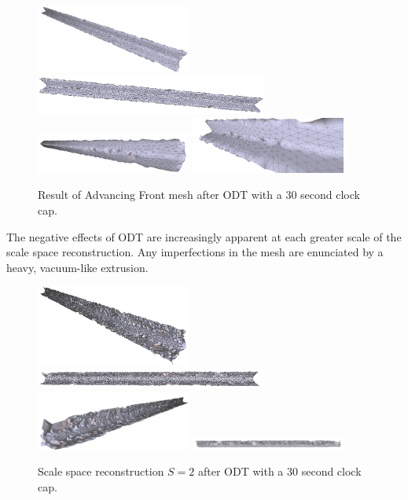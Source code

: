 \documentclass[12pt]{drexelthesis}
\begin{document}
\begin{figure}[!ht]
	\centering
		\includegraphics[width=2in]{simulated-lab-scan/0noise/optimized/advancedfrontlloydodt00.png}
		\includegraphics[width=3in]{simulated-lab-scan/0noise/optimized/advancedfrontlloydodt01.png}
		\includegraphics[width=2in]{simulated-lab-scan/0noise/optimized/advancedfrontlloydodt02.png}
		\includegraphics[width=2in]{simulated-lab-scan/0noise/optimized/advancedfrontlloydodt03.png}
		\caption[Advancing Front mesh after ODT with a 30 second clock cap]{\centering  Result of Advancing Front mesh after ODT with a 30 second clock cap.}
	\label{zeronoise:advancedodt}
\end{figure}

The negative effects of ODT are increasingly apparent at each greater scale of the scale space reconstruction. Any imperfections in the mesh are enunciated by a heavy, vacuum-like extrusion.

\begin{figure}[!ht]
	\centering
		\includegraphics[width=2in]{simulated-lab-scan/0noise/optimized/scalespace2odt00.png}
		\includegraphics[width=3in]{simulated-lab-scan/0noise/optimized/scalespace2odt01.png}
		\includegraphics[width=2in]{simulated-lab-scan/0noise/optimized/scalespace2odt02.png}
		\includegraphics[width=2in]{simulated-lab-scan/0noise/optimized/scalespace2odt03.png}
		\caption[Scale space reconstruction $S = 2$ after ODT with a 30 second clock cap]{\centering Scale space reconstruction $S = 2$ after ODT with a 30 second clock cap.}
	\label{zeronoise:scalespace2odt}
\end{figure}
\end{document}
